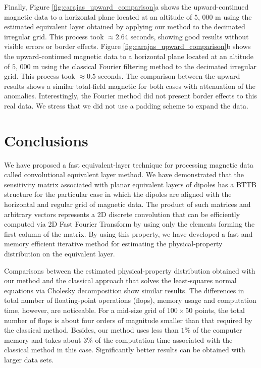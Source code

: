 \documentclass[manuscript,noblind]{geophysics}
\begin{document}
Finally, Figure \ref{fig:carajas_upward_comparison}a shows the upward-continued magnetic data to a
horizontal plane located at an altitude of $5, \,000$ m using the estimated equivalent layer obtained by applying our
method to the decimated irregular grid. This process took $\approx 2.64$ seconds, showing good results 
without visible errors or border effects. 
Figure \ref{fig:carajas_upward_comparison}b shows the upward-continued magnetic data to a
horizontal plane located at an altitude of $5, \,000$ m using the classical Fourier filtering method to the decimated irregular grid.
This process took $\approx 0.5$ seconds.
The comparison between the upward results shows a similar total-field magnetic for both cases with attenuation of the anomalies. Interestingly, the Fourier method did not present border effects to this real data. We stress that we did not use a padding scheme to expand the data.


\section{Conclusions}

We have proposed a fast equivalent-layer technique for processing magnetic data called
convolutional equivalent layer method.
We have demonstrated that the sensitivity matrix associated with planar 
equivalent layers of dipoles has a BTTB structure for the particular case in which 
the dipoles are aligned with the horizontal and regular grid of magnetic data.
The product of such matrices and arbitrary vectors represents a 2D discrete convolution
that can be efficiently computed via 2D Fast Fourier Transform by using only the 
elements forming the first column of the matrix.
By using this property, we have developed a fast and memory efficient iterative method for 
estimating the physical-property distribution on the equivalent layer.

Comparisons between the estimated physical-property distribution obtained with our method and 
the classical approach that solves the least-squares normal equations via Cholesky decomposition 
show similar results. 
The differences in total number of floating-point operations (flops), memory usage and computation 
time, however, are noticeable. 
For a mid-size grid of $100 \times 50$ points, the total number of flops is about four orders of
magnitude smaller than that required by the classical method. Besides, our method uses
less than $1\%$ of the computer memory and takes about $3\%$ of the computation time associated with
the classical method in this case.%
Significantly better results can be obtained with larger data sets.
\end{document}
